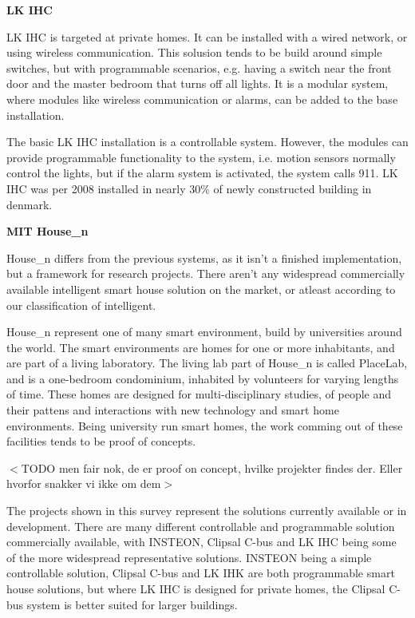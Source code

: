 \textbf{LK IHC}

LK IHC is targeted at private homes. It can be installed with a wired network, or using wireless communication. This solusion tends to be build around simple switches, but with programmable scenarios, e.g. having a switch near the front door and the master bedroom that turns off all lights. It is a modular system, where modules like wireless communication or alarms, can be added to the base installation. 

The basic LK IHC installation is a controllable system. However, the modules can provide programmable functionality to the system, i.e. motion sensors normally control the lights, but if the alarm system is activated, the system calls 911. LK IHC was per 2008 installed in nearly 30\% of newly constructed building in denmark.~\citep{MSsurvey} ~\citep{LK IHC}

\textbf{MIT House\_n}

House\_n differs from the previous systems, as it isn't a finished implementation, but a framework for research projects. There aren't any widespread commercially available intelligent smart house solution on the market, or atleast according to our classification of intelligent. 

House\_n represent one of many smart environment, build by universities around the world. The smart environments are homes for one or more inhabitants, and are part of a living laboratory. The living lab part of House\_n is called PlaceLab, and is a one-bedroom condominium, inhabited by volunteers for varying lengths of time. These homes are designed for multi-disciplinary studies, of people and their pattens and interactions with new technology and smart home environments. Being university run smart homes, the work comming out of these facilities tends to be proof of concepts. ~\citep{MIT House_n}

$<$TODO men fair nok, de er proof on concept, hvilke projekter findes der. Eller hvorfor snakker vi ikke om dem$>$

The projects shown in this survey represent the solutions currently available or in development. There are many different controllable and programmable solution commercially available, with INSTEON, Clipsal C-bus and LK IHC being some of the more widespread representative solutions. INSTEON being a simple controllable solution, Clipsal C-bus and LK IHK are both programmable smart house solutions, but where LK IHC is designed for private homes, the Clipsal C-bus system is better suited for larger buildings. 

